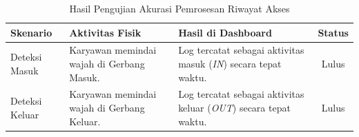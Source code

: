 \begin{table}[t]
\centering
\caption{Hasil Pengujian Akurasi Pemrosesan Riwayat Akses}
\label{tab:test_log_accuracy}
\begin{tabular}{|l|p{5cm}|p{3.5cm}|c|}
\hline
\textbf{Skenario} & \textbf{Aktivitas Fisik} & \textbf{Hasil di Dashboard} & \textbf{Status} \\ \hline
Deteksi Masuk & Karyawan memindai wajah di Gerbang Masuk. & Log tercatat sebagai aktivitas masuk (\textit{IN}) secara tepat waktu. & Lulus \\ \hline
Deteksi Keluar & Karyawan memindai wajah di Gerbang Keluar. & Log tercatat sebagai aktivitas keluar (\textit{OUT}) secara tepat waktu. & Lulus \\ \hline
\end{tabular}
\end{table}